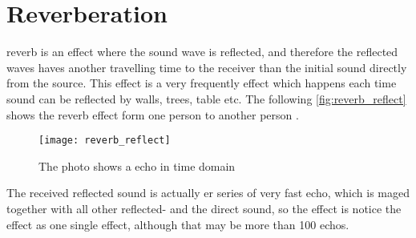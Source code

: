 \section{Reverberation}
\gls{reverb} is an effect where the sound wave is reflected, and therefore the reflected waves haves another travelling time to the receiver than the initial sound directly from the source. This effect is a very frequently effect which happens each time sound can be reflected by walls, trees, table etc. The following \autoref{fig:reverb_reflect} shows the \gls{reverb} effect form one person to another person \citep{reverb_expl}.

\begin{figure} [htbp]
 \centering
  \texttt{[image: reverb\_reflect]}
  \caption{The photo shows a echo in time domain}
  \label{fig:reverb_reflect}
\end{figure}

The received reflected sound is actually er series of very fast echo, which is maged together with all other reflected- and the direct sound, so the effect is notice the effect as one single effect, although that may be more than 100 echos. 

